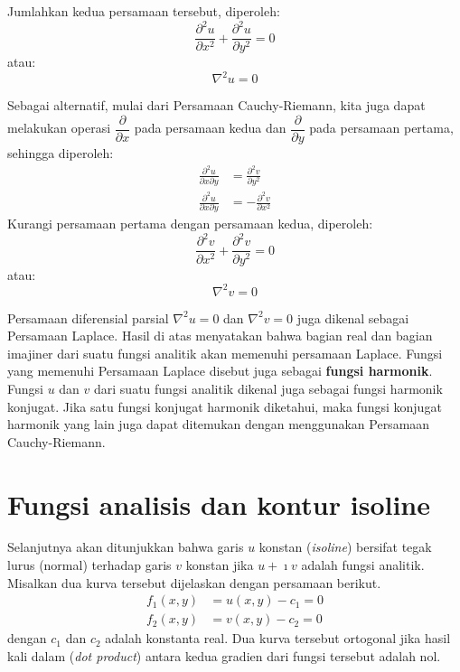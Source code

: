 Jumlahkan kedua persamaan tersebut, diperoleh:
\begin{equation*}
\frac{\partial^{2}u}{\partial x^{2}}+\frac{\partial^{2}u}{\partial y^{2}}=0
\end{equation*}
atau:
\begin{equation}
\nabla^{2} u = 0    
\end{equation}

Sebagai alternatif, mulai dari Persamaan Cauchy-Riemann, kita juga
dapat melakukan operasi $\dfrac{\partial}{\partial x}$ pada persamaan
kedua dan $\dfrac{\partial}{\partial y}$ pada persamaan pertama,
sehingga diperoleh:
\begin{align*}
\frac{\partial^{2}u}{\partial x\partial y} &= \frac{\partial^{2}v}{\partial y^{2}} \\
\frac{\partial^{2}u}{\partial x\partial y} &= -\frac{\partial^{2}v}{\partial x^{2}}
\end{align*}
%
Kurangi persamaan pertama dengan persamaan kedua, diperoleh:
\begin{equation*}
\frac{\partial^{2}v}{\partial x^{2}}+\frac{\partial^{2}v}{\partial y^{2}}=0    
\end{equation*}
atau:
\begin{equation}
\nabla^{2}v=0    
\end{equation}

Persamaan diferensial parsial $\nabla^{2}u=0$ dan $\nabla^{2}v=0$
juga dikenal sebagai Persamaan Laplace. Hasil di atas menyatakan bahwa
bagian real dan bagian imajiner dari suatu fungsi analitik akan memenuhi
persamaan Laplace. Fungsi yang memenuhi Persamaan Laplace disebut
juga sebagai \textbf{fungsi harmonik}. Fungsi $u$ dan $v$ dari suatu
fungsi analitik dikenal juga sebagai fungsi harmonik konjugat. Jika
satu fungsi konjugat harmonik diketahui, maka fungsi konjugat harmonik
yang lain juga dapat ditemukan dengan menggunakan Persamaan Cauchy-Riemann.


\section{Fungsi analisis dan kontur isoline}

Selanjutnya akan ditunjukkan bahwa garis $u$ konstan (\textit{isoline}) bersifat tegak lurus (normal)
terhadap garis $v$ konstan jika $u + \imath v$ adalah fungsi analitik.
Misalkan dua kurva tersebut dijelaskan dengan persamaan berikut.
\begin{align*}
f_{1}(x,y) & = u(x,y) - c_{1} = 0\\
f_{2}(x,y) & = v(x,y) - c_{2} = 0
\end{align*}
dengan $c_1$ dan $c_2$ adalah konstanta real.
Dua kurva tersebut ortogonal jika hasil kali dalam (\textit{dot product}) antara kedua gradien
dari fungsi tersebut adalah nol.

